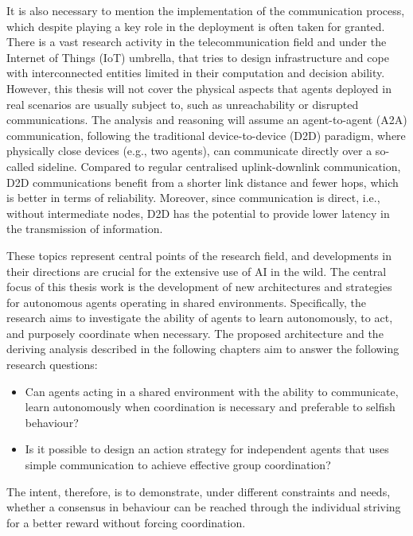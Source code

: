 \documentclass[a4paper,singleside,12pt]{report} %
\begin{document}
It is also necessary to mention the implementation of the communication process, which despite playing a key role in the deployment is often taken for granted. There is a vast research activity in the telecommunication field and under the Internet of Things (IoT) umbrella, that tries to design infrastructure and cope with interconnected entities limited in their computation and decision ability. However, this thesis will not cover the physical aspects that agents deployed in real scenarios are usually subject to, such as unreachability or disrupted communications. The analysis and reasoning will assume an agent-to-agent (A2A) communication, following the traditional device-to-device (D2D) paradigm, where physically close devices (e.g., two agents), can communicate directly over a so-called sideline. Compared to regular centralised uplink-downlink communication, D2D communications benefit from a shorter link distance and fewer hops, which is better in terms of reliability. Moreover, since communication is direct, i.e., without intermediate nodes, D2D has the potential to provide lower latency in the transmission of information.

These topics represent central points of the research field, and developments in their directions are crucial for the extensive use of AI in the wild. The central focus of this thesis work is the development of new architectures and strategies for autonomous agents operating in shared environments. Specifically, the research aims to investigate the ability of agents to learn autonomously, to act, and purposely coordinate when necessary. The proposed architecture and the deriving analysis described in the following chapters aim to answer the following research questions:

\begin{itemize}
\item Can agents acting in a shared environment with the ability to communicate, learn autonomously when coordination is necessary and preferable to selfish behaviour?
\item Is it possible to design an action strategy for independent agents that uses simple communication to achieve effective group coordination?
\end{itemize}

The intent, therefore, is to demonstrate, under different constraints and needs, whether a consensus in behaviour can be reached through the individual striving for a better reward without forcing coordination.
\end{document}
